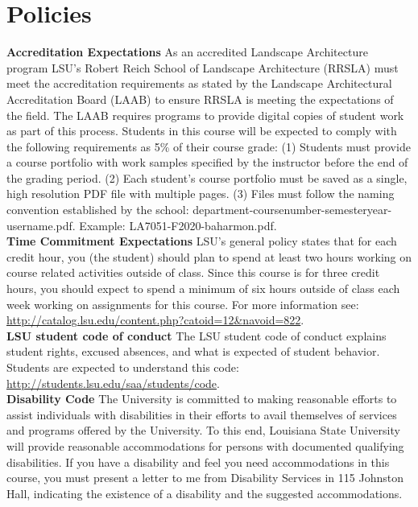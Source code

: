 \documentclass[11pt,article,oneside]{memoir}
\begin{document}
\clearpage

\section{Policies}

\noindent \textbf{Accreditation Expectations}
As an accredited Landscape Architecture program
LSU's Robert Reich School of Landscape Architecture (RRSLA) 
must meet the accreditation requirements 
as stated by the Landscape Architectural Accreditation
Board (LAAB) to ensure RRSLA is meeting the expectations of the field. 
The LAAB requires programs to provide digital copies 
of student work as part of this process.
Students in this course will be expected 
to comply with the following requirements
as 5\% of their course grade: 
(1) Students must provide a course portfolio
with work samples specified by the instructor 
before the end of the grading period. 
(2) Each student's course portfolio must be saved as 
a single, high resolution PDF file with multiple pages. 
(3) Files must follow the naming convention
established by the school: department-coursenumber-semesteryear-username.pdf.
Example: LA7051-F2020-baharmon.pdf.\\

\noindent \textbf{Time Commitment Expectations}
LSU's general policy states that for each credit hour, you (the student) should plan to
spend at least two hours working on course related activities outside of class. Since this course is for three credit hours, you should expect to spend a minimum of six hours outside of class each week working on assignments for this course. For more information see: 
\url{http://catalog.lsu.edu/content.php?catoid=12&navoid=822}.\\

\noindent \textbf{LSU student code of conduct}
The LSU student code of conduct explains student rights, excused absences, and what is expected of student behavior. Students are expected to understand this code:  \url{http://students.lsu.edu/saa/students/code}.\\ %

\noindent \textbf{Disability Code}
The University is committed to making reasonable efforts to assist individuals with disabilities in
their efforts to avail themselves of services and programs offered by the University. To this end,
Louisiana State University will provide reasonable accommodations for persons with
documented qualifying disabilities. If you have a disability and feel you need accommodations in
this course, you must present a letter to me from Disability Services in 115 Johnston Hall,
indicating the existence of a disability and the suggested accommodations.\\
\end{document}
